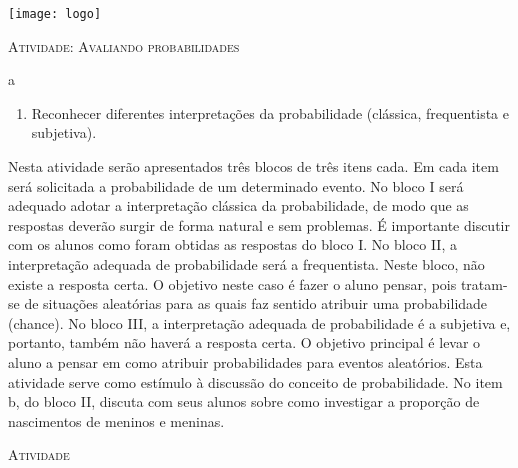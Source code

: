 \documentclass[10 pt,usenames,dvipsnames, oneside]{article}
\begin{document}
\begin{center}
  \begin{minipage}[l]{3cm}
\texttt{[image: logo]}    
\end{minipage}\hfill
\begin{minipage}[r]{.8\textwidth}
 {\Large \scshape Atividade: Avaliando probabilidades}  
\end{minipage}
\end{center}
\vspace{.2cm}

\ifdefined\prof
\begin{objetivos}
\item a
\end{objetivos}

\begin{goals}
\begin{enumerate}
\item Reconhecer diferentes interpretações da probabilidade (clássica, frequentista e subjetiva).
\end{enumerate}

\tcblower


Nesta atividade serão apresentados três blocos de três itens cada. Em cada item será solicitada a probabilidade de um determinado evento. No bloco I será adequado adotar a interpretação clássica da probabilidade, de modo que as respostas deverão surgir de forma natural e sem problemas. É importante discutir com os alunos como foram obtidas as respostas do bloco I. No bloco II, a interpretação adequada de probabilidade será a frequentista. Neste bloco, não existe a resposta certa. O objetivo neste caso é fazer o aluno pensar, pois tratam-se de situações aleatórias para as quais faz sentido atribuir uma probabilidade (chance). No bloco III, a interpretação adequada de probabilidade é a subjetiva e, portanto, também não haverá a resposta certa. O objetivo principal é levar o aluno a pensar em como atribuir probabilidades para eventos aleatórios. Esta atividade serve como estímulo à discussão do conceito de probabilidade. No item b, do bloco II, discuta com seus alunos sobre como investigar a proporção de nascimentos de meninos e meninas.

\end{goals}

\bigskip
\begin{center}
{\large \scshape Atividade}
\end{center}
\fi
\end{document}
